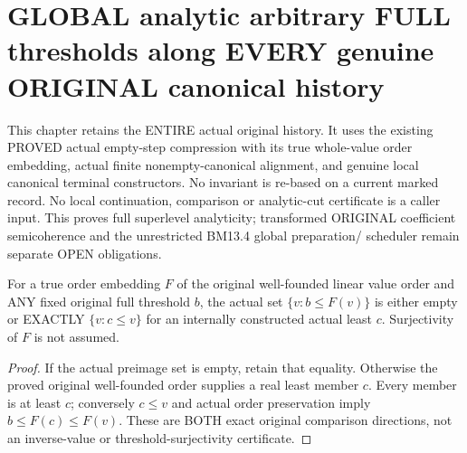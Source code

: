 \section{GLOBAL analytic arbitrary FULL thresholds along EVERY genuine ORIGINAL canonical history}

This chapter retains the ENTIRE actual original history. It uses the existing
PROVED actual empty-step compression with its true whole-value order embedding,
actual finite nonempty-canonical alignment, and genuine local canonical
terminal constructors. No invariant is re-based on a current marked record.
No local continuation, comparison or analytic-cut certificate is a caller
input. This proves full superlevel analyticity; transformed ORIGINAL
coefficient semicoherence and the unrestricted BM13.4 global preparation/
scheduler remain separate OPEN obligations.

\begin{lemma}
\label{hir:original-whole-value-order-embedding-threshold-preimage}
\leanok
For a true order embedding $F$ of the original well-founded linear value
order and ANY fixed original full threshold $b$, the actual set
$\{v:b\le F(v)\}$ is either empty or EXACTLY $\{v:c\le v\}$ for an internally
constructed actual least $c$. Surjectivity of $F$ is not assumed.
\end{lemma}
\begin{proof}
If the actual preimage set is empty, retain that equality. Otherwise the
proved original well-founded order supplies a real least member $c$.
Every member is at least $c$; conversely $c\le v$ and actual order preservation
imply $b\le F(c)\le F(v)$. These are BOTH exact original comparison directions,
not an inverse-value or threshold-surjectivity certificate.
\end{proof}

